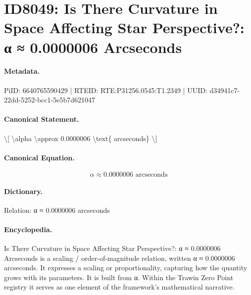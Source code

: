 \section*{ID8049: Is There Curvature in Space Affecting Star Perspective?: α ≈ 0.0000006 Arcseconds}
\paragraph{Metadata.}
PiID: 6640765590429 | RTEID: RTE:P31256.0545:T1.2349 | UUID: d34941c7-22dd-5252-bcc1-5e5b7d621047

\paragraph{Canonical Statement.}
\textbackslash{}[ \textbackslash{}alpha \textbackslash{}approx 0.0000006 \textbackslash{}text\{ arcseconds\} \textbackslash{}]

\paragraph{Canonical Equation.}
\[
\alpha \approx 0.0000006 \text{ arcseconds}
\]

\paragraph{Dictionary.}
Relation: α ≈ 0.0000006 arcseconds

\paragraph{Encyclopedia.}
Is There Curvature in Space Affecting Star Perspective?: α ≈ 0.0000006 Arcseconds is a scaling / order-of-magnitude relation, written α ≈ 0.0000006 arcseconds. It expresses a scaling or proportionality, capturing how the quantity grows with its parameters. It is built from α. Within the Trawin Zero Point registry it serves as one element of the framework's mathematical narrative.
